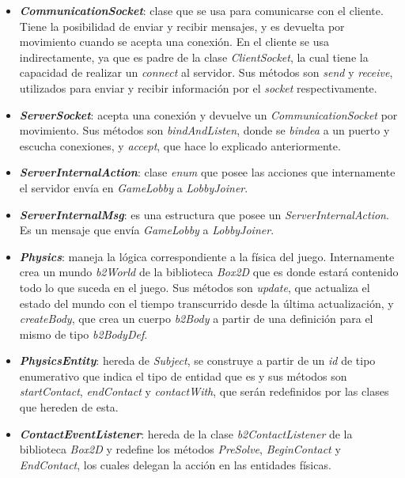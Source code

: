 \begin{itemize}
	\item \textbf{\textit{CommunicationSocket}}: clase que se usa para comunicarse con el cliente. Tiene la posibilidad de enviar y recibir mensajes, y es devuelta por movimiento cuando se acepta una conexión. En el cliente se usa indirectamente, ya que es padre de la clase \textit{ClientSocket}, la cual tiene la capacidad de realizar un \textit{connect} al servidor. Sus métodos son \textit{send} y \textit{receive}, utilizados para enviar y recibir información por el \textit{socket} respectivamente.
	
	\item \textbf{\textit{ServerSocket}}: acepta una conexión y devuelve un \textit{CommunicationSocket} por movimiento. Sus métodos son \textit{bindAndListen}, donde se \textit{bindea} a un puerto y escucha conexiones, y \textit{accept}, que hace lo explicado anteriormente.
	
	\item \textbf{\textit{ServerInternalAction}}: clase \textit{enum} que posee las acciones que internamente el servidor envía en \textit{GameLobby} a \textit{LobbyJoiner}.
	
	\item \textbf{\textit{ServerInternalMsg}}: es una estructura que posee un \textit{ServerInternalAction}. Es un mensaje que envía \textit{GameLobby} a \textit{LobbyJoiner}.
	
	\item \textbf{\textit{Physics}}: maneja la lógica correspondiente a la física del juego. Internamente crea un mundo \textit{b2World} de la biblioteca \textit{Box2D} que es donde estará contenido todo lo que suceda en el juego. Sus métodos son \textit{update}, que actualiza el estado del mundo con el tiempo transcurrido desde la última actualización, y \textit{createBody}, que crea un cuerpo \textit{b2Body} a partir de una definición para el mismo de tipo \textit{b2BodyDef}.
	
	\item \textbf{\textit{PhysicsEntity}}: hereda de \textit{Subject}, se construye a partir de un \textit{id} de tipo enumerativo que indica el tipo de entidad que es y sus métodos son \textit{startContact}, \textit{endContact} y \textit{contactWith}, que serán redefinidos por las clases que hereden de esta.
	
	\item \textbf{\textit{ContactEventListener}}: hereda de la clase \textit{b2ContactListener} de la biblioteca \textit{Box2D} y redefine los métodos \textit{PreSolve}, \textit{BeginContact} y \textit{EndContact}, los cuales delegan la acción en las entidades físicas.
	

\end{itemize}
